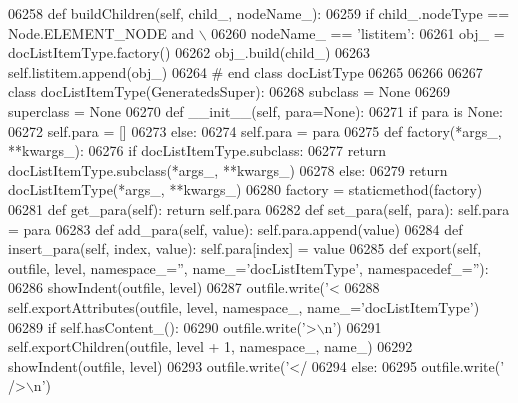\begin{DoxyCode}
{{{{{{{{{{{{{{{{{{{{{{{{{{{{{{{{{{{{{{{{{{{{{{{{{{{{{{{{{{{{{{{{{{{{{{{{{{{{{{{{{{{{{{{{{{{{{{{{{{{{{{{{{{{{{{{{{{{{{{{{{{{{{{{{{{{{{{{{{{{{{{{{{{{{{{{{{{{{{{{{{{{{{{{{{{{{{{{{{{{{{{{{{{{{{{{{{{{{{{{{{{{{{{{{{{{{{{{{{{{{{{{{{{{{{{{{{{{{{{{{{{{{{{{{{{{{{{{{{{{{{{{{{{{{{{{{{{{{{{{{{{{{{{{{{{{{{{{{{{{{{{{{{{{{{{{{{{{{{{{{{{{{{{{{{{{{{{{{{{{{{{{{{{{{{{{{{{{{{{{{{{{{{{{{{{{{{{{{{{{{{{{{{{{{{{06258     \textcolor{keyword}{def }buildChildren(self, child\_, nodeName\_):
06259         \textcolor{keywordflow}{if} child\_.nodeType == Node.ELEMENT\_NODE \textcolor{keywordflow}{and} \(\backslash\)
06260             nodeName\_ == \textcolor{stringliteral}{'listitem'}:
06261             obj\_ = docListItemType.factory()
06262             obj\_.build(child\_)
06263             self.listitem.append(obj\_)
06264 \textcolor{comment}{# end class docListType}
06265 
06266 
06267 \textcolor{keyword}{class }docListItemType(GeneratedsSuper):
06268     subclass = \textcolor{keywordtype}{None}
06269     superclass = \textcolor{keywordtype}{None}
06270     \textcolor{keyword}{def }__init__(self, para=None):
06271         \textcolor{keywordflow}{if} para \textcolor{keywordflow}{is} \textcolor{keywordtype}{None}:
06272             self.para = []
06273         \textcolor{keywordflow}{else}:
06274             self.para = para
06275     \textcolor{keyword}{def }factory(*args\_, **kwargs\_):
06276         \textcolor{keywordflow}{if} docListItemType.subclass:
06277             \textcolor{keywordflow}{return} docListItemType.subclass(*args\_, **kwargs\_)
06278         \textcolor{keywordflow}{else}:
06279             \textcolor{keywordflow}{return} docListItemType(*args\_, **kwargs\_)
06280     factory = staticmethod(factory)
06281     \textcolor{keyword}{def }get_para(self): \textcolor{keywordflow}{return} self.para
06282     \textcolor{keyword}{def }set_para(self, para): self.para = para
06283     \textcolor{keyword}{def }add_para(self, value): self.para.append(value)
06284     \textcolor{keyword}{def }insert_para(self, index, value): self.para[index] = value
06285     \textcolor{keyword}{def }export(self, outfile, level, namespace\_='', name\_='docListItemType', namespacedef\_=''):
06286         showIndent(outfile, level)
06287         outfile.write(\textcolor{stringliteral}{'<%
06288         self.exportAttributes(outfile, level, namespace\_, name\_=\textcolor{stringliteral}{'docListItemType'})
06289         \textcolor{keywordflow}{if} self.hasContent_():
06290             outfile.write(\textcolor{stringliteral}{'>\(\backslash\)n'})
06291             self.exportChildren(outfile, level + 1, namespace\_, name\_)
06292             showIndent(outfile, level)
06293             outfile.write(\textcolor{stringliteral}{'</%
06294         \textcolor{keywordflow}{else}:
06295             outfile.write(\textcolor{stringliteral}{' />\(\backslash\)n'})
}}}}}}}}}}}}}}}}}}}}}}}}}}}}}}}}}}}}}}}}}}}}}}}}}}}}}}}}}}}}}}}}}}}}}}}}}}}}}}}}}}}}}}}}}}}}}}}}}}}}}}}}}}}}}}}}}}}}}}}}}}}}}}}}}}}}}}}}}}}}}}}}}}}}}}}}}}}}}}}}}}}}}}}}}}}}}}}}}}}}}}}}}}}}}}}}}}}}}}}}}}}}}}}}}}}}}}}}}}}}}}}}}}}}}}}}}}}}}}}}}}}}}}}}}}}}}}}}}}}}}}}}}}}}}}}}}}}}}}}}}}}}}}}}}}}}}}}}}}}}}}}}}}}}}}}}}}}}}}}}}}}}}}}}}}}}}}}}}}}}}}}}}}}}}}}}}}}}}}}}}}}}}}}}}}}}}}}}}}}}}}}}}}}}}}}}
\end{DoxyCode}
